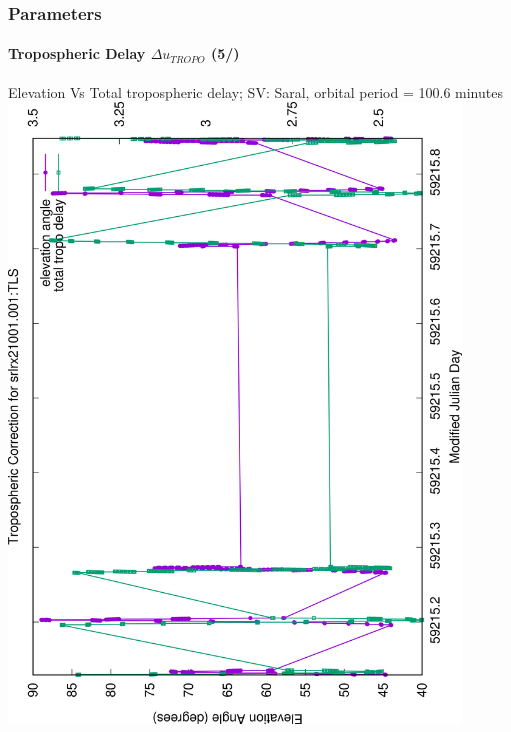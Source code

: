 \documentclass{beamer}
\begin{document}
\begin{frame}\frametitle{Parameters}\framesubtitle{Tropospheric Delay \(\Delta u_{TROPO}\) (5/)}
  Elevation Vs Total tropospheric delay; SV: Saral, orbital period = 100.6 minutes
  \includegraphics[angle=-90, width=0.9\textwidth]{srlrx21001.001-tropo-correction-one-day}%
\end{frame}
\end{document}
